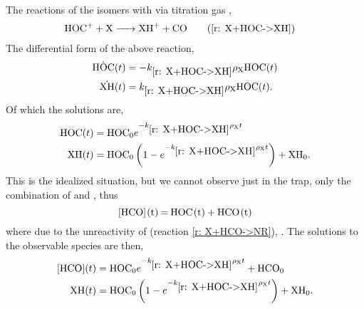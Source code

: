 \section{} \label{sec: [HCO]+X eqs}

The reactions of the isomers \ce{[HCO]+} with via titration gas ,
\begin{align*}
	\ce{HOC+ + X & -> XH+ + CO} \tag{\ref{r: X+HOC->XH}}
\end{align*}
The differential form of the above reaction,
\begin{align*}
	\dot{\ce{HOC}}(t) & = - k_{\ref{r: X+HOC->XH}} \rho_{\ce{X}} \ce{HOC}(t) \\
	\dot{\ce{XH}}(t) & = k_{\ref{r: X+HOC->XH}} \rho_{\ce{X}} \ce{HOC}(t).
\end{align*}
Of which the solutions are,
\begin{align*}
	\ce{HOC}(t) & = \ce{HOC0}e^{-k_{\ref{r: X+HOC->XH}} \rho_{\ce{X}} t} \\
	\ce{XH}(t) & = \ce{HOC0}\left(1-e^{-k_{\ref{r: X+HOC->XH}} \rho_{\ce{X}} t}\right) + \ce{XH0}.
\end{align*}
This is the idealized situation, but we cannot observe just  in the trap, only the combination of  and , thus
\begin{equation*}
	\ce{[HCO](t) = HOC(t) + HCO(t)}
\end{equation*}
where due to the unreactivity of  (reaction \ref{r: X+HCO->NR}), . The solutions to the observable species are then,
\begin{align}
	\ce{[HCO]}(t) & = \ce{HOC0}e^{-k_{\ref{r: X+HOC->XH}} \rho_{\ce{X}} t} + \ce{HCO0} \label{eq: X [HCO](t)} \\
	\ce{XH}(t) & = \ce{HOC0}\left(1-e^{-k_{\ref{r: X+HOC->XH}} \rho_{\ce{X}} t}\right) + \ce{XH0}. \label{eq: X XH(t)}
\end{align}